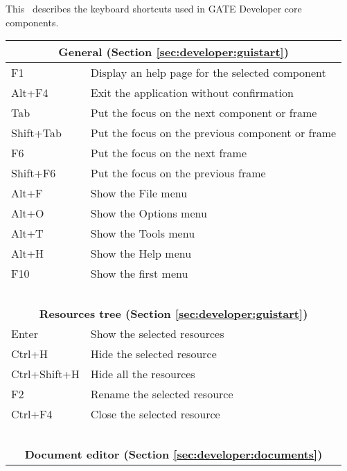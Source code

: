 \nnormalsize

This \chapthing\ describes the keyboard shortcuts used in GATE Developer core components.

\begin{table}[hbt]
\label{table:keyboard-shortcuts}
\begin{center}
\begin{tabular}{|l|l|}
\multicolumn{2}{c}{\bf{General} (Section \ref{sec:developer:guistart})}\\
\hline
F1 & Display an help page for the selected component\\
\hline
Alt+F4 & Exit the application without confirmation\\
\hline
Tab & Put the focus on the next component or frame\\
\hline
Shift+Tab & Put the focus on the previous component or frame\\
\hline
F6 & Put the focus on the next frame\\
\hline
Shift+F6 & Put the focus on the previous frame\\
\hline
Alt+F & Show the File menu\\
\hline
Alt+O & Show the Options menu\\
\hline
Alt+T & Show the Tools menu\\
\hline
Alt+H & Show the Help menu\\
\hline
F10 & Show the first menu\\
\hline
\multicolumn{2}{c}{\ }\\
\multicolumn{2}{c}{\bf{Resources tree} (Section \ref{sec:developer:guistart})}\\
\hline
Enter & Show the selected resources\\
\hline
Ctrl+H & Hide the selected resource\\
\hline
Ctrl+Shift+H & Hide all the resources\\
\hline
F2 & Rename the selected resource\\
\hline
Ctrl+F4 & Close the selected resource\\
\hline
\multicolumn{2}{c}{\ }\\
\multicolumn{2}{c}{\bf{Document editor} (Section \ref{sec:developer:documents})}\\

\end{tabular}
\end{center}
\end{table}
